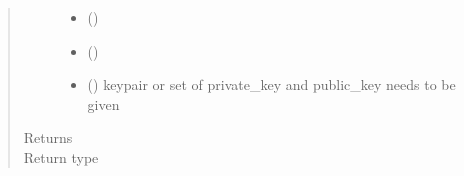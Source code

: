 \documentclass[letterpaper,10pt,english]{sphinxmanual}
\begin{document}
\begin{fulllineitems}
\begin{fulllineitems}
\begin{quote}
\begin{description}
\begin{itemize}
\item {} 
 () \textendash{} 

\item {} 
 () \textendash{} 

\item {} 
 ({\hyperref[\detokenize{bbc1.core.bbclib:bbc1.core.bbclib.KeyPair}]{}}) \textendash{} keypair or set of private\_key and public\_key needs to be given

\end{itemize}

\item[{Returns}] \leavevmode


\item[{Return type}] \leavevmode
{\hyperref[\detokenize{bbc1.core.bbclib:bbc1.core.bbclib.BBcSignature}]{}}

\end{description}\end{quote}

\end{fulllineitems}


\end{fulllineitems}

\end{document}

